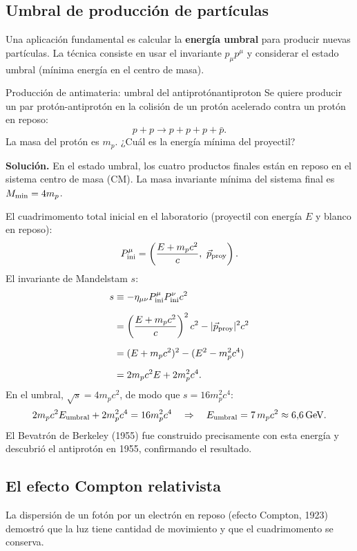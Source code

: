 \subsection{Umbral de producción de partículas}

Una aplicación fundamental es calcular la \textbf{energía umbral} para producir nuevas partículas. La técnica consiste en usar el invariante $p_\mu p^\mu$ y considerar el estado umbral (mínima energía en el centro de masa).

\begin{ejemplo}{Producción de antimateria: umbral del antiprotón}{antiproton}
Se quiere producir un par protón-antiprotón en la colisión de un protón acelerado contra un protón en reposo:
\[
  p + p \to p + p + p + \bar{p}.
\]
La masa del protón es $m_p$. ¿Cuál es la energía mínima del proyectil?

\textbf{Solución.} En el estado umbral, los cuatro productos finales están en reposo en el sistema centro de masa (CM). La masa invariante mínima del sistema final es $M_{\rm min} = 4m_p$.

El cuadrimomento total inicial en el laboratorio (proyectil con energía $E$ y blanco en reposo):
\[
  P^\mu_{\rm ini} = \left(\frac{E + m_p c^2}{c},\ \vec{p}_{\rm proy}\right).
\]
El invariante de Mandelstam $s$:
\begin{align*}
  s &\equiv -\eta_{\mu\nu}P^\mu_{\rm ini}P^\nu_{\rm ini}c^2 \nl
  &= \left(\frac{E + m_p c^2}{c}\right)^2 c^2 - |\vec{p}_{\rm proy}|^2 c^2 \nl
  &= (E + m_p c^2)^2 - (E^2 - m_p^2 c^4) \nl
  &= 2m_p c^2 E + 2m_p^2 c^4.
\end{align*}
En el umbral, $\sqrt{s} = 4m_p c^2$, de modo que $s = 16 m_p^2 c^4$:
\[
  2m_p c^2 E_{\rm umbral} + 2m_p^2 c^4 = 16 m_p^2 c^4
  \quad\Rightarrow\quad
  E_{\rm umbral} = 7\,m_p c^2 \approx 6{,}6\,\si{GeV}.
\]
El Bevatrón de Berkeley (1955) fue construido precisamente con esta energía y descubrió el antiprotón en 1955, confirmando el resultado.
\end{ejemplo}

\subsection{El efecto Compton relativista}

La dispersión de un fotón por un electrón en reposo (efecto Compton, 1923) demostró que la luz tiene cantidad de movimiento y que el cuadrimomento se conserva.


